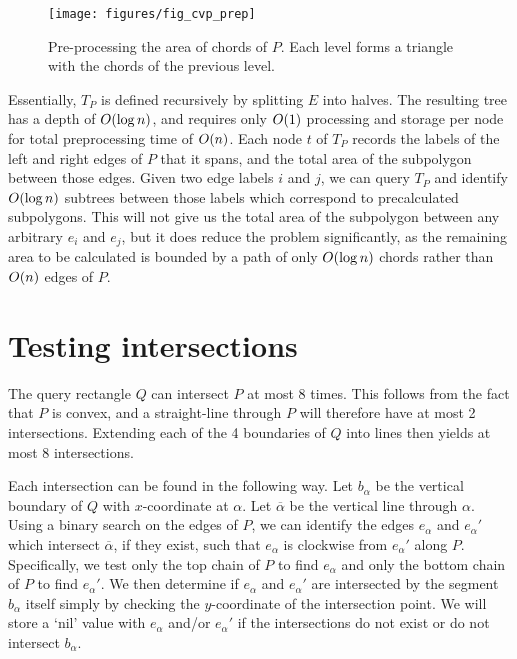\begin{figure}[h]
\begin{center}
  \texttt{[image: figures/fig\_cvp\_prep]}
  \caption[Pre-processing the area of chords of $P$]{Pre-processing the area of chords of $P$.  Each level forms a triangle with the chords of the previous level.}
  \label{fig:convexp:preprocessing}
\end{center}
\end{figure}

Essentially, $T_P$ is defined recursively by splitting $E$ into halves. The resulting tree has a depth of $O\!\left(\log{n}\right)$, and requires only $O\!\left(1\right)$ processing and storage per node for total preprocessing time of $O\!\left(n\right)$. Each node $t$ of $T_P$ records the labels of the left and right edges of $P$ that it spans, and the total area of the subpolygon between those edges. Given two edge labels $i$ and $j$, we can query $T_P$ and identify $O\!\left(\log{n}\right)$ subtrees between those labels which correspond to precalculated subpolygons. This will not give us the total area of the subpolygon between any arbitrary $e_i$ and $e_j$, but it does reduce the problem significantly, as the remaining area to be calculated is bounded by a path of only $O\!\left(\log{n}\right)$ chords rather than $O\!\left(n\right)$ edges of $P$.


\section{Testing intersections}
\label{:convexp:intersections}

The query rectangle $Q$ can intersect $P$ at most $8$ times. This follows from the fact that $P$ is convex, and a straight-line through $P$ will therefore have at most 2 intersections. Extending each of the 4 boundaries of $Q$ into lines then yields at most 8 intersections.

Each intersection can be found in the following way. Let $b_\alpha$ be the vertical boundary of $Q$ with $x$-coordinate at $\alpha$. Let $\overline{\alpha}$ be the vertical line through $\alpha$. Using a binary search on the edges of $P$, we can identify the edges $e_\alpha$ and $e_\alpha'$ which intersect $\overline{\alpha}$, if they exist, such that $e_\alpha$ is clockwise from $e_\alpha'$ along $P$.  Specifically, we test only the top chain of $P$ to find $e_\alpha$ and only the bottom chain of $P$ to find $e_\alpha'$. We then determine if $e_\alpha$ and $e_\alpha'$ are intersected by the segment $b_\alpha$ itself simply by checking the $y$-coordinate of the intersection point. We will store a `nil' value with $e_\alpha$ and/or $e_\alpha'$ if the intersections do not exist or do not intersect $b_\alpha$.

